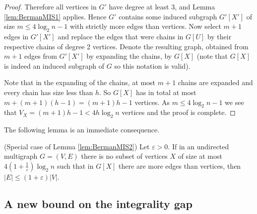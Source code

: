 \begin{proof}
Therefore all vertices in $G'$ have degree at least 3, and Lemma \ref{lem:BermanMIS1} applies. Hence $G'$ contains some induced subgraph $G'[X']$ of size $m \leq 4 \log_2 n - 1$ with strictly more edges than vertices. Now select $m+1$ edges in $G'[X']$ and replace the edges that were chains in $G[U]$ by their respective chains of degree 2 vertices. Denote the resulting graph, obtained from $m+1$ edges from $G'[X']$ by expanding the chains, by $G[X]$ (note that $G[X]$ is indeed an induced subgraph of $G$ so this notation is valid).

Note that in the expanding of the chains, at most $m+1$ chains are expanded and every chain has size less than $h$. So $G[X]$ has in total at most $m + (m+1)(h-1) = (m+1)h - 1$ vertices. As $m \leq 4 \log_2 n - 1$ we see that $V_X = (m+1)h - 1 < 4 h \log_2 n$ vertices and the proof is complete.
\end{proof}
%
The following lemma is an immediate consequence.
%
\begin{lemma}\label{lem:BermanMIS3}
(Special case of Lemma \ref{lem:BermanMIS2}) Let $\varepsilon > 0$. If in an undirected multigraph $G = (V,E)$ there is no subset of vertices $X$ of size at most $4 (1 + \frac{1}{\varepsilon}) \log_2 n$ such that in $G[X]$ there are more edges than vertices, then $|E| \leq (1 + \varepsilon) |V|$.
\end{lemma}

\subsection{A new bound on the integrality gap}\label{subsec:TheoremLP}

